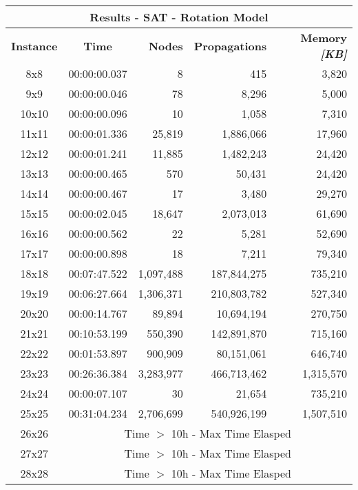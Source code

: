 
\begin{center}
    \begin{tabular}{|c|c|r|r|r|}
        \hline
        \multicolumn{5}{|c|}{\textbf{Results - SAT - Rotation Model}} \\
        \hline
        \textbf{Instance} & \textbf{Time} & \textbf{Nodes} & \textbf{Propagations} & \textbf{Memory \textit{[KB]}} \\
        
        \hline
		8x8 & 00:00:00.037 & 8 & 415 & 3,820 \\ \hline
		9x9 & 00:00:00.046 & 78 & 8,296 & 5,000 \\ \hline
		10x10 & 00:00:00.096 & 10 & 1,058 & 7,310 \\ \hline
		11x11 & 00:00:01.336 & 25,819 & 1,886,066 & 17,960 \\ \hline
		12x12 & 00:00:01.241 & 11,885 & 1,482,243 & 24,420 \\ \hline
		13x13 & 00:00:00.465 & 570 & 50,431 & 24,420 \\ \hline
		14x14 & 00:00:00.467 & 17 & 3,480 & 29,270 \\ \hline
		15x15 & 00:00:02.045 & 18,647 & 2,073,013 & 61,690 \\ \hline
		16x16 & 00:00:00.562 & 22 & 5,281 & 52,690 \\ \hline
		17x17 & 00:00:00.898 & 18 & 7,211 & 79,340 \\ \hline
		18x18 & 00:07:47.522 & 1,097,488 & 187,844,275 & 735,210 \\ \hline
		19x19 & 00:06:27.664 & 1,306,371 & 210,803,782 & 527,340 \\ \hline
		20x20 & 00:00:14.767 & 89,894 & 10,694,194 & 270,750 \\ \hline
		21x21 & 00:10:53.199 & 550,390 & 142,891,870 & 715,160 \\ \hline
		22x22 & 00:01:53.897 & 900,909 & 80,151,061 & 646,740 \\ \hline
		23x23 & 00:26:36.384 & 3,283,977 & 466,713,462 & 1,315,570 \\ \hline
		24x24 & 00:00:07.107 & 30 & 21,654 & 735,210 \\ \hline
		25x25 & 00:31:04.234 & 2,706,699 & 540,926,199 & 1,507,510 \\ \hline
		26x26 & \multicolumn{4}{|c|}{Time $>$ 10h - Max Time Elasped} \\ \hline
		27x27 & \multicolumn{4}{|c|}{Time $>$ 10h - Max Time Elasped} \\ \hline
		28x28 & \multicolumn{4}{|c|}{Time $>$ 10h - Max Time Elasped} \\ \hline

\end{tabular}
\end{center}
